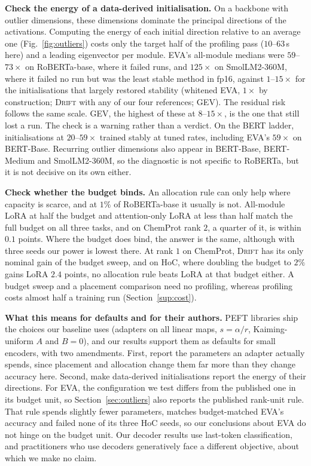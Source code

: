 \documentclass[conference,onecolumn]{IEEEtran}
\newcommand{\method}{\textsc{Drift}}
\begin{document}
\noindent\textbf{Check the energy of a data-derived initialisation.} On a
backbone with outlier dimensions, these dimensions dominate the principal
directions of the activations. Computing the energy of each initial direction
relative to an average one (Fig.~\ref{fig:outliers}) costs only the target half
of the profiling pass ($10$--$63$\,s here) and a leading eigenvector per module.
EVA's all-module medians were $59$--$73\times$ on RoBERTa-base, where it failed
runs, and
$125\times$ on SmolLM2-360M, where it failed no run but was the least stable
method in fp16, against $1$--$15\times$ for the initialisations that largely
restored stability (whitened EVA, $1\times$ by
construction; \method{} with any of our four references; GEV). The residual
risk follows the same scale. GEV, the highest of these at $8$--$15\times$, is
the one that still lost a run. The check is a warning rather than a verdict. On
the BERT ladder, initialisations at $20$--$59\times$ trained stably at tuned
rates, including EVA's $59\times$ on BERT-Base. Recurring outlier dimensions
also appear in BERT-Base, BERT-Medium and SmolLM2-360M, so the diagnostic is not
specific to RoBERTa, but it is not decisive on its own either.

\noindent\textbf{Check whether the budget binds.} An allocation rule can only
help where capacity is scarce, and at $1\%$ of RoBERTa-base it usually is not.
All-module LoRA at half the budget and attention-only LoRA at less than half
match the full budget on all three tasks, and on ChemProt rank $2$, a quarter of
it, is within $0.1$ points. Where the budget does bind, the answer is the same,
although with three seeds our power is lowest there.
At rank $1$ on ChemProt, \method{} has its only nominal gain of the budget
sweep, and on HoC, where doubling the budget to $2\%$ gains LoRA $2.4$ points,
no allocation rule beats LoRA at that budget either. A budget sweep and a
placement comparison need no profiling, whereas profiling costs almost half a
training run (Section~\ref{sup:cost}).

\noindent\textbf{What this means for defaults and for their authors.} PEFT
libraries ship the choices our baseline uses (adapters on all linear maps,
$s = \alpha/r$, Kaiming-uniform $A$ and $B = 0$), and our results support them
as defaults for small encoders, with two amendments. First, report the
parameters an adapter actually spends, since placement and allocation change
them far more than they change accuracy here. Second, make data-derived
initialisations report the energy of their directions. For EVA, the
configuration we test differs from the published one in its budget unit, so
Section~\ref{sec:outliers} also reports the published rank-unit rule. That rule
spends slightly fewer parameters, matches budget-matched EVA's accuracy and
failed none of its three HoC seeds, so our conclusions about EVA do not hinge on
the budget unit. Our decoder results use last-token classification, and
practitioners who use decoders generatively face a different objective, about
which we make no claim.
\end{document}

